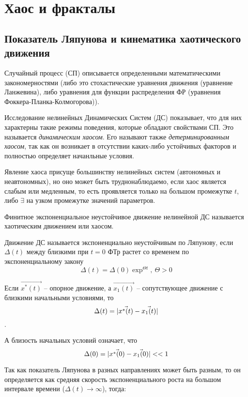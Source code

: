 \chapter{Хаос и фракталы}

\section{Показатель Ляпунова и кинематика хаотического движения}

Случайный процесс (СП) описывается определенными математическими закономерностями (либо это стохастические уравнения движения (уравнение Ланжевина), либо уравнения для функции распределения ФР (уравнения Фоккера-Планка-Колмогорова)).

Исследование нелинейных Динамических Систем (ДС) показывает, что  для них характерны такие режимы поведения, которые обладают свойствами СП. Это называется \textit{динамическим хаосом}. Его называют также \textit{детерминированным хаосом}, так как он возникает в отсутствии каких-либо устойчивых факторов и полностью определяет начанльные условия.

Явление хаоса присуще большинству нелинейных систем (автономных и неавтономных), но оно может быть труднонаблюдаемо, если хаос является слабым или медленным, то есть проявляется только на большом промежутке $t$, либо $\exists$ на узком промежутке значений параметров.

\begin{definition}
  Финитное экспоненциальное неустойчивое движение нелинейной ДС называется хаотическим движением или хаосом.
\end{definition}

\begin{definition}
  Движение ДС называется экспоненциально неустойчивым по Ляпунову, если $\Delta(t)$ между близкими при $t=0$ ФТр растет со временем по экспоненциальному закону
  $$\Delta(t) = \Delta(0) \exp^{\Theta t}, \ \Theta > 0$$
\end{definition}

Если $\vec{x^{*}(t)}$ -- опорное движение, а $\vec{x_{1}(t)}$ -- сопутствующее движение с близкими начальными условиями, то $$\Delta(t) = \lvert\vec{x^{*}(t)} - \vec{x_{1}(t)}\rvert$$.

А близость начальных условий означает, что $$\Delta(0) = \lvert\vec{x^{*}(0)} - \vec{x_{1}(0)}\rvert << 1$$

Так как показатель Ляпунова в разных направлениях может быть разным, то он определяется как средняя скорость экспоненциального роста на большом интервале времени ($\Delta(t) \rightarrow \infty$), тогда:


